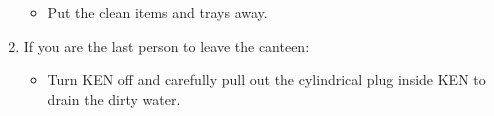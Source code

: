 \begin{enumerate}
\begin{itemize}

\item Put the clean items and trays away.

\end{itemize}

\bfseries \item If you are the last person to leave the canteen: \normalfont

\begin{itemize}

\item Turn KEN off and carefully pull out the cylindrical plug inside KEN to
drain the dirty water.

\end{itemize}

\end{enumerate}

